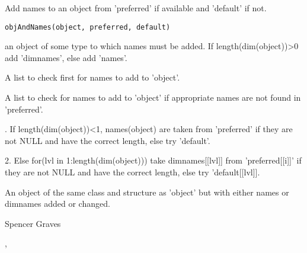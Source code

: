 \begin{Description}\relax
Add names to an object from 'preferred' if available and 'default' if
not.
\end{Description}
\begin{Usage}
\begin{verbatim}
objAndNames(object, preferred, default)
\end{verbatim}
\end{Usage}
\begin{Arguments}
\begin{ldescription}
\item[\code{object}] an object of some type to which names must be added.  If
length(dim(object))>0 add 'dimnames', else add 'names'.  

\item[\code{preferred}] A list to check first for names to add to 'object'.  

\item[\code{default}] A list to check for names to add to 'object' if appropriate names
are not found in 'preferred'.  

\end{ldescription}
\end{Arguments}
\begin{Details}.  If length(dim(object))<1, names(object) are taken from 'preferred'
if they are not NULL and have the correct length, else try 'default'.

2.  Else for(lvl in 1:length(dim(object))) take dimnames[[lvl]] from
'preferred[[i]]' if they are not NULL and have the correct length,
else try 'default[[lvl]].
\end{Details}
\begin{Value}
An object of the same class and structure as 'object' but with either
names or dimnames added or changed.
\end{Value}
\begin{Author}\relax
Spencer Graves
\end{Author}
\begin{SeeAlso}\relax
{}, 
\end{SeeAlso}
